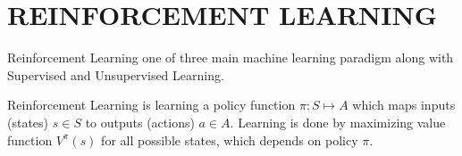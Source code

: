 \chapter{REINFORCEMENT LEARNING}

\label{chap:rl_chap}

Reinforcement Learning one of three main machine learning paradigm along with Supervised and Unsupervised Learning.

Reinforcement Learning is learning a policy function $\pi \colon S \mapsto A$ which maps inputs (states) $s \in S$ to outputs (actions) $a \in A$. Learning is done by maximizing value function $V^{\pi}(s)$ for all possible states, which depends on policy $\pi$.